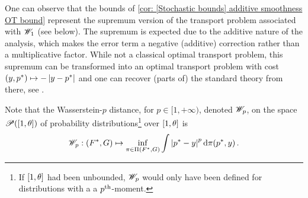One can observe that the bounds of \cref{cor: [Stochastic bounds] additive smoothness OT bound} represent the supremum version of the transport problem associated with $\mathscr{W}_1$ (see below). The supremum is expected due to the additive nature of the analysis, which makes the error term a negative (additive) correction rather than a multiplicative factor. While not a classical optimal transport problem, this supremum can be transformed into an optimal transport problem with cost $(y,p^*)\mapsto - \left\lvert y-p^* \right\rvert$ and one can recover (parts of) the standard theory from there, see \eg \cite{villani_optimal_2009}.

Note that the Wasserstein-$p$ distance, for $p\in[1,+\infty)$, denoted $\mathscr{W}_p$, on the space $\mathscr{P}([1,\theta])$ of probability distributions\footnote{If $[1,\theta]$ had been unbounded, $\mathscr{W}_p$ would only have been defined for distributions with a a $p\textsuperscript{th}$-moment.} over $[1,\theta]$ is 
\[
    \mathscr{W}_p:(F^*,G)\mapsto\inf_{\pi\in\Pi(F^*,G)}\int \left\lvert p^*-y \right\rvert^p\mathrm{d}\pi(p^*,y)\,.
\]